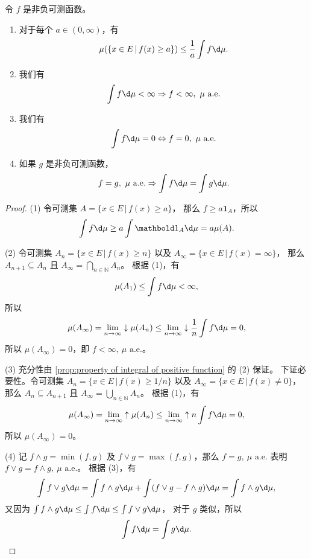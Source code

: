 \documentclass[fontset=none]{Notes}
\newcommand{\ulim}[1][]{\lim_{#1}\mathrel{\uparrow}}
\newcommand{\dlim}[1][]{\lim_{#1}\mathrel{\downarrow}}
\newcommand{\indicator}[1]{\mathbold 1_{#1}}
\newcommand{\alev}[1]{\text{$#1$ a.e.}}
\begin{document}
\begin{proposition}
  令 $f$ 是非负可测函数。
  \begin{enumerate}
    \item 对于每个 $a\in(0,\infty)$，有
    \[
      \mu(\{x\in E\,|\, f(x)\geq a\})\leq \frac{1}{a}\int f\d\mu.
    \]
    \item 我们有
    \[
      \int f\d\mu<\infty\Rightarrow f<\infty,\ \text{$\mu$ a.e.}
    \]
    \item 我们有
    \[
      \int f\d\mu=0\Leftrightarrow f=0,\ \text{$\mu$ a.e.}
    \]
    \item 如果 $g$ 是非负可测函数，
    \[
      f=g,\ \text{$\mu$ a.e.}\Rightarrow \int f\d\mu=\int g\d\mu.
    \]
  \end{enumerate}
\end{proposition}
\begin{proof}
  (1) 令可测集
  $
    A=\{x\in E\,|\, f(x)\geq a\}
  $，
  那么 $f\geq a\indicator{A}$，所以
  \[
    \int f\d\mu\geq a\int \indicator{A}\d\mu  
    =a\mu(A).
  \]

  (2) 令可测集
  $
    A_n=\{x\in E\,|\, f(x)\geq n\}  
  $ 以及 $A_\infty=\{x\in E\,|\, f(x)=\infty\}$，
  那么 $A_{n+1}\subseteq A_n$ 且 $A_\infty=\bigcap_{n\in \mathbb{N}}A_n$。
  根据 (1)，有
  \[
    \mu(A_1)\leq \int f\d\mu<\infty,  
  \]
  所以
  \[
    \mu(A_\infty)=\dlim[n\to\infty] \mu(A_n)\leq
    \dlim[n\to\infty]\frac{1}{n}\int f\d\mu=0, 
  \]
  所以 $\mu(A_\infty)=0$，即 $f<\infty,\ \alev{\mu}$。

  (3) 充分性由 \autoref{prop:property of integral of positive function} 的 (2) 保证。
  下证必要性。令可测集
  $
    A_n=\{x\in E\,|\, f(x)\geq 1/n\}  
  $ 以及
  $A_\infty=\{x\in E\,|\, f(x)\neq 0\}$，那么
  $A_n\subseteq A_{n+1}$ 且 $A_\infty=\bigcup_{n\in \mathbb{N}}A_n$。
  根据 (1)，有
  \[
    \mu(A_\infty)=\ulim[n\to\infty]\mu(A_n)\leq
    \ulim[n\to\infty]n\int f\d\mu=0,
  \]
  所以 $\mu(A_\infty)=0$。

  (4) 记 $f\wedge g=\min(f,g)$ 及 $f\vee g=\max(f,g)$，那么
  $f=g,\ \alev{\mu}$ 表明  $f\vee g=f\wedge g,\ \alev{\mu}$。
  根据 (3)，有
  \[
    \int f\vee g\d\mu=\int f\wedge g\d\mu+\int (f\vee g-f\wedge g)\d\mu
    =\int f\wedge g\d\mu,  
  \]
  又因为 $\int f\wedge g\d\mu\leq \int f\d\mu\leq \int f\vee g\d\mu$，
  对于 $g$ 类似，所以
  \[
    \int f\d\mu=\int g\d\mu.\qedhere  
  \]
\end{proof}
\end{document}
